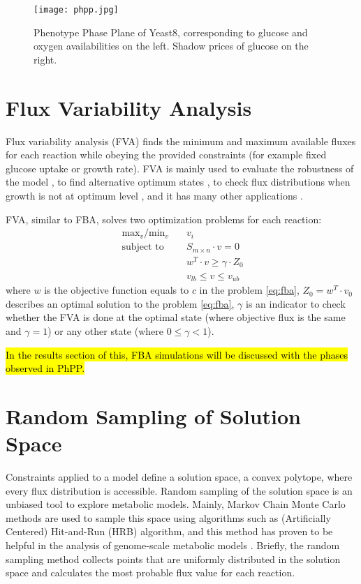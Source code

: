 \begin{figure}[H]
\begin{center}
\texttt{[image: phpp.jpg]}
\end{center}
\caption[Phenotype Phase Plane of Yeast8]{Phenotype Phase Plane of Yeast8, corresponding to glucose and oxygen availabilities on the left. Shadow prices of glucose on the right.}
\label{fig:phpp}
\end{figure}


\section{Flux Variability Analysis}
Flux variability analysis (FVA) finds the minimum and maximum available fluxes for each reaction while obeying the provided constraints (for example fixed glucose uptake or growth rate). FVA is mainly used to evaluate the robustness of the model \cite{thiele2010functional}, to find alternative optimum states \cite{mahadevan2003effects}, to check flux distributions when growth is not at optimum level \cite{reed2004genome}, and it has many other applications \cite{gudmundsson2010computationally}.

FVA, similar to FBA, solves two optimization problems for each reaction:
 \begin{align}
 \ \text{max}_v / \text{min}_v \quad & v_i \\
 \ \text{subject to} \quad & S_{m \times n} \cdot v=0 \\
 \ & w^T \cdot v \geq \gamma \cdot Z_0 \\
 \ & v_{lb} \leq v \leq v_{ub}
 \end{align}
\noindent where $w$ is the objective function equals to $c$ in the problem \ref{eq:fba}, $Z_0 = w^T \cdot v_0$ describes an optimal solution to the problem \ref{eq:fba}, $\gamma$ is an indicator to check whether the FVA is done at the optimal state (where objective flux is the same and $\gamma = 1$) or any other state (where $0 \leq \gamma < 1$).


\hl{In the results section of this, FBA simulations will be discussed with the phases observed in PhPP.}


\section{Random Sampling of Solution Space}
Constraints applied to a model define a solution space, a convex polytope, where every flux distribution is accessible. Random sampling of the solution space is an unbiased tool to explore metabolic models. Mainly, Markov Chain Monte Carlo methods are used to sample this space using algorithms such as (Artificially Centered) Hit-and-Run (HRB) \cite{kiatsupaibul2011analysis, saa2016ll} algorithm, and this method has proven to be helpful in the analysis of genome-scale metabolic models \cite{schellenberger2009use}. Briefly, the random sampling method collects points that are uniformly distributed in the solution space and calculates the most probable flux value for each reaction.

